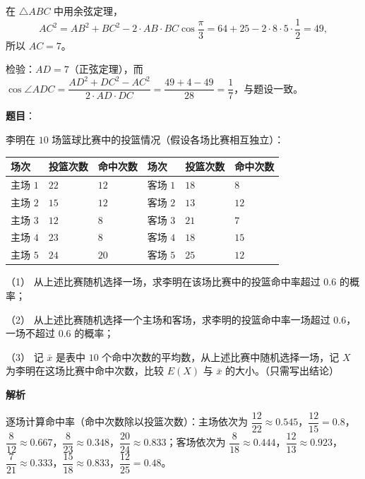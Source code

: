\begin{answer}
在 $\triangle ABC$ 中用余弦定理，
\nopagebreak[4]
\[AC^2=AB^2+BC^2-2\cdot AB\cdot BC\cos\frac\pi3=64+25-2\cdot8\cdot5\cdot\frac12=49,\]
所以 $AC=7$。

检验：$AD=7$（正弦定理），而 $\cos\angle ADC=\dfrac{AD^2+DC^2-AC^2}{2\cdot AD\cdot DC}=\dfrac{49+4-49}{28}=\dfrac17$，与题设一致。



\end{answer}
\begin{answer}

\textbf{题目}：

李明在 $10$ 场篮球比赛中的投篮情况（假设各场比赛相互独立）：

\begin{center}
\begin{tabular}{llllll}
\toprule
场次 & 投篮次数 & 命中次数 & 场次 & 投篮次数 & 命中次数 \\
\midrule
主场 $1$ & $22$ & $12$ & 客场 $1$ & $18$ & $8$ \\
主场 $2$ & $15$ & $12$ & 客场 $2$ & $13$ & $12$ \\
主场 $3$ & $12$ & $8$ & 客场 $3$ & $21$ & $7$ \\
主场 $4$ & $23$ & $8$ & 客场 $4$ & $18$ & $15$ \\
主场 $5$ & $24$ & $20$ & 客场 $5$ & $25$ & $12$ \\
\bottomrule
\end{tabular}
\end{center}

（1） 从上述比赛随机选择一场，求李明在该场比赛中的投篮命中率超过 $0.6$ 的概率；

（2） 从上述比赛随机选择一个主场和客场，求李明的投篮命中率一场超过 $0.6$，一场不超过 $0.6$ 的概率；

（3） 记 $\bar x$ 是表中 $10$ 个命中次数的平均数，从上述比赛中随机选择一场，记 $X$ 为李明在这场比赛中命中次数，比较 $E(X)$ 与 $\bar x$ 的大小。（只需写出结论）

\textbf{解析}


逐场计算命中率（命中次数除以投篮次数）：主场依次为 $\dfrac{12}{22}\approx0.545$，$\dfrac{12}{15}=0.8$，$\dfrac{8}{12}\approx0.667$，$\dfrac{8}{23}\approx0.348$，$\dfrac{20}{24}\approx0.833$；客场依次为 $\dfrac{8}{18}\approx0.444$，$\dfrac{12}{13}\approx0.923$，$\dfrac{7}{21}\approx0.333$，$\dfrac{15}{18}\approx0.833$，$\dfrac{12}{25}=0.48$。


\end{answer}
